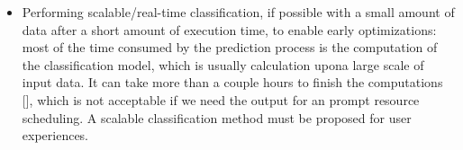 \begin{itemize}
\item Performing scalable/real-time classification, if possible with a small amount of data after a short amount of execution time, to enable early optimizations: most of the time consumed by the prediction process is the computation of the classification model, which is usually calculation upona  large scale of input data. It can take more than a couple hours to finish the computations [], which is not acceptable if we need the output for an prompt resource scheduling. A scalable classification method must be proposed for user experiences.
\end{itemize}